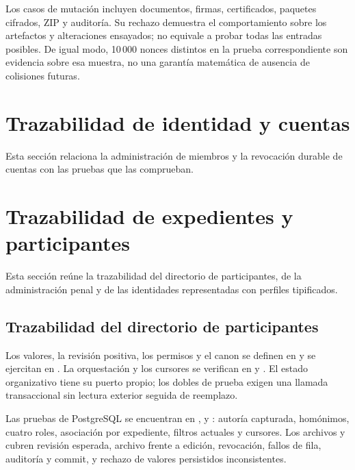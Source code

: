 Los casos de mutación incluyen documentos, firmas, certificados, paquetes cifrados, ZIP y auditoría. Su rechazo demuestra el comportamiento sobre los artefactos y alteraciones ensayados; no equivale a probar todas las entradas posibles. De igual modo, 10\,000 nonces distintos en la prueba correspondiente son evidencia sobre esa muestra, no una garantía matemática de ausencia de colisiones futuras.



\section{Trazabilidad de identidad y cuentas}\label{sec:matriz-grupo-identidad}

Esta sección relaciona la administración de miembros y la revocación durable de cuentas con las pruebas que las comprueban.



\section{Trazabilidad de expedientes y participantes}\label{sec:matriz-grupo-expedientes}

Esta sección reúne la trazabilidad del directorio de participantes, de la administración penal y de las identidades representadas con perfiles tipificados.

\subsection{Trazabilidad del directorio de participantes}\label{sec:matriz-participantes}

{\raggedright Los valores, la revisión positiva, los permisos y el canon se definen en  y se ejercitan en . La orquestación y los cursores se verifican en  y . El estado organizativo tiene su puerto propio; los dobles de prueba exigen una llamada transaccional sin lectura exterior seguida de reemplazo.\par}

{\raggedright Las pruebas de PostgreSQL se encuentran en ,  y : autoría capturada, homónimos, cuatro roles, asociación por expediente, filtros actuales y cursores. Los archivos  y  cubren revisión esperada, archivo frente a edición, revocación, fallos de fila, auditoría y commit, y rechazo de valores persistidos inconsistentes.\par}

